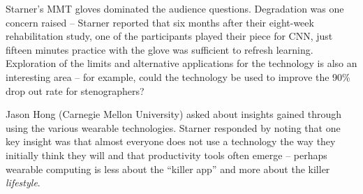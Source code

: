 Starner's MMT gloves dominated the audience questions.
Degradation was one concern raised -- Starner reported that six
months after their eight-week rehabilitation study, one of the participants
played their piece for CNN, just fifteen minutes practice with the glove was
sufficient to refresh learning. Exploration of the limits and alternative
applications for the technology is also an interesting area -- for example,
could the technology be used to improve the 90\% drop out rate for
stenographers?

Jason Hong (Carnegie Mellon University) asked about insights gained through using
the various wearable technologies. Starner responded by noting that one key 
insight was that almost everyone does not use a technology the way they initially 
think they will and that productivity tools often emerge -- perhaps wearable 
computing is less about the ``killer app'' and more about the killer 
\emph{lifestyle}.